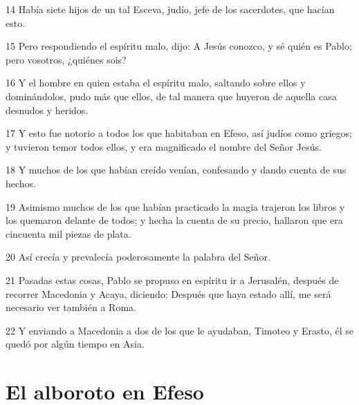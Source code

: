 \par 14 Había siete hijos de un tal Esceva, judío, jefe de los sacerdotes, que hacían esto.
\par 15 Pero respondiendo el espíritu malo, dijo: A Jesús conozco, y sé quién es Pablo; pero vosotros, ¿quiénes sois?
\par 16 Y el hombre en quien estaba el espíritu malo, saltando sobre ellos y dominándolos, pudo más que ellos, de tal manera que huyeron de aquella casa desnudos y heridos.
\par 17 Y esto fue notorio a todos los que habitaban en Efeso, así judíos como griegos; y tuvieron temor todos ellos, y era magnificado el nombre del Señor Jesús.
\par 18 Y muchos de los que habían creído venían, confesando y dando cuenta de sus hechos.
\par 19 Asimismo muchos de los que habían practicado la magia trajeron los libros y los quemaron delante de todos; y hecha la cuenta de su precio, hallaron que era cincuenta mil piezas de plata.
\par 20 Así crecía y prevalecía poderosamente la palabra del Señor.
\par 21 Pasadas estas cosas, Pablo se propuso en espíritu ir a Jerusalén, después de recorrer Macedonia y Acaya, diciendo: Después que haya estado allí, me será necesario ver también a Roma.
\par 22 Y enviando a Macedonia a dos de los que le ayudaban, Timoteo y Erasto, él se quedó por algún tiempo en Asia.

\section*{El alboroto en Efeso}

